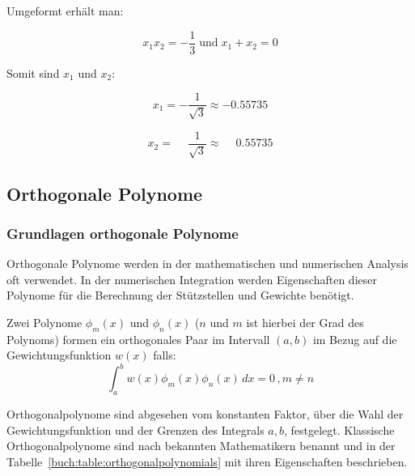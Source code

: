 \noindent
Umgeformt erhält man:

\begin{equation}
    x_{1}x_{2} = -\frac{1}{3}
    \;
    \text{und}
    \;
    x_{1}+x_{2} = 0
\end{equation}

\noindent
Somit sind $ x_{1} $ und $ x_{2} $:

\begin{equation*}
    x_{1} = -\frac{1}{\sqrt{3}} \approx -0.55735
\end{equation*}

\begin{equation}
    x_{2} = \phantom{-} \frac{1}{\sqrt{3}} \approx \phantom{-}0.55735
\end{equation}

\newpage

\subsection{Orthogonale Polynome
\label{quadratur:subsection:orthogonalepolynome}}

\subsubsection{Grundlagen orthogonale Polynome}
Orthogonale Polynome werden in der mathematischen und 
numerischen Analysis oft verwendet.
In der numerischen Integration werden Eigenschaften dieser Polynome für
die Berechnung der Stützstellen und Gewichte benötigt.
\newline

\noindent
Zwei Polynome $\phi_{m}(x)$ und $\phi_{n}(x)$ 
($n$ und $m$ ist hierbei der Grad des Polynoms) formen ein 
orthogonales Paar im Intervall $(a, b)$ im Bezug auf die Gewichtungsfunktion
$w(x)$ falls:
\begin{equation}
    \int_{a}^{b} w(x) \phi_{m}(x) \phi_{n}(x)\,dx = 0 \, , m \neq n
\end{equation}

\noindent
Orthogonalpolynome sind abgesehen vom konstanten Faktor, über die Wahl der
Gewichtungsfunktion und der Grenzen des Integrals $a, b$, festgelegt.
Klassische Orthogonalpolynome sind nach bekannten Mathematikern 
benannt und in der Tabelle~\ref{buch:table:orthogonalpolynomials} mit ihren
Eigenschaften beschrieben.

